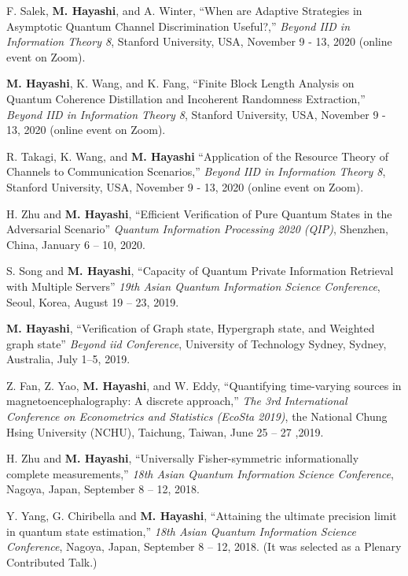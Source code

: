 \documentclass[a4paper,12pt,oneside]{article}
\begin{document}
\begin{enumerate}
F. Salek, \textbf{M. Hayashi}, and A. Winter,
``When are Adaptive Strategies in Asymptotic Quantum Channel Discrimination Useful?,''
{\em Beyond IID in Information Theory 8}, Stanford University, USA, November 9 - 13, 2020 (online event on Zoom).

\textbf{M. Hayashi}, K. Wang, and K. Fang,
``Finite Block Length Analysis on Quantum Coherence Distillation and Incoherent Randomness Extraction,''
{\em Beyond IID in Information Theory 8}, Stanford University, USA, November 9 - 13, 2020 (online event on Zoom).

R. Takagi, K. Wang, and \textbf{M. Hayashi} 
``Application of the Resource Theory of Channels to Communication Scenarios,''
{\em Beyond IID in Information Theory 8}, Stanford University, USA, November 9 - 13, 2020 (online event on Zoom).

H. Zhu and \textbf{M. Hayashi}, 
``Efficient Verification of Pure Quantum States in the Adversarial Scenario''
{\em Quantum Information Processing 2020 (QIP)}, 
Shenzhen, China, January 6 -- 10, 2020.

S. Song and \textbf{M. Hayashi}, 
``Capacity of Quantum
Private Information Retrieval with Multiple Servers''
{\em 19th Asian Quantum Information Science Conference},
Seoul, Korea, August 19 -- 23, 2019.

\textbf{M. Hayashi}, 
``Verification of Graph state, Hypergraph state, and Weighted graph state''
{\em Beyond iid Conference},
University of Technology Sydney, Sydney, Australia, 
July 1--5, 2019.

Z. Fan, Z. Yao, \textbf{M. Hayashi}, and W. Eddy,
``Quantifying time-varying sources in magnetoencephalography: A discrete approach,''
{\em The 3rd International Conference on Econometrics and Statistics (EcoSta 2019)},
the National Chung Hsing University (NCHU), Taichung, Taiwan, June 25 -- 27 ,2019.

H. Zhu and \textbf{M. Hayashi},
``Universally Fisher-symmetric informationally complete measurements,''
{\em 18th Asian Quantum Information Science Conference},
Nagoya, Japan, September 8 -- 12, 2018.

Y. Yang, G. Chiribella and \textbf{M. Hayashi},
``Attaining the ultimate precision limit in quantum state estimation,''
{\em 18th Asian Quantum Information Science Conference},
Nagoya, Japan, September 8 -- 12, 2018.
(It was selected as a Plenary Contributed Talk.)


\end{enumerate}
\end{document}
